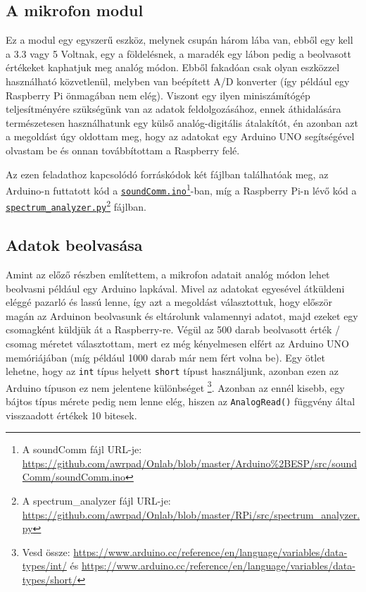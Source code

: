 \documentclass[12pt,a4paper]{article}
\begin{document}
    \subsection{A mikrofon modul}
      Ez a modul egy egyszerű eszköz, melynek csupán három lába van, ebből egy kell a 3.3 vagy 5 Voltnak, egy a földelésnek, a maradék egy lábon pedig a beolvasott értékeket kaphatjuk meg analóg módon. Ebből fakadóan csak olyan eszközzel használható közvetlenül, melyben van beépített A/D konverter (így például egy Raspberry Pi önmagában nem elég). Viszont egy ilyen miniszámítógép teljesítményére szükségünk van az adatok feldolgozásához, ennek áthidalására természetesen használhatunk egy külső analóg-digitális átalakítót, én azonban azt a megoldást úgy oldottam meg, hogy az adatokat egy Arduino UNO segítségével olvastam be és onnan továbbítottam a Raspberry felé.

      Az ezen feladathoz kapcsolódó forráskódok két fájlban találhatóak meg, az Arduino-n futtatott kód a \href{https://github.com/awrpad/Onlab/blob/master/Arduino\%2BESP/src/soundComm/soundComm.ino}{\texttt{soundComm.ino}}\footnote{A soundComm fájl URL-je: \url{https://github.com/awrpad/Onlab/blob/master/Arduino\%2BESP/src/soundComm/soundComm.ino}}-ban, míg a Raspberry Pi-n lévő kód a \href{https://github.com/awrpad/Onlab/blob/master/RPi/src/spectrum\_analyzer.py}{\texttt{spectrum\_analyzer.py}}\footnote{A spectrum\_analyzer fájl URL-je: \url{https://github.com/awrpad/Onlab/blob/master/RPi/src/spectrum\_analyzer.py}} fájlban.

    \subsection{Adatok beolvasása}
      Amint az előző részben említettem, a mikrofon adatait analóg módon lehet beolvasni például egy Arduino lapkával. Mivel az adatokat egyesével átküldeni eléggé pazarló és lassú lenne, így azt a megoldást választottuk, hogy először magán az Arduinon beolvasunk és eltárolunk valamennyi adatot, majd ezeket egy csomagként küldjük át a Raspberry-re. Végül az 500 darab beolvasott érték / csomag méretet választottam, mert ez még kényelmesen elfért az Arduino UNO memóriájában (míg például 1000 darab már nem fért volna be). Egy ötlet lehetne, hogy az \texttt{int} típus helyett \texttt{short} típust használjunk, azonban ezen az Arduino típuson ez nem jelentene különbséget \footnote{Vesd össze: \url{https://www.arduino.cc/reference/en/language/variables/data-types/int/} és \url{https://www.arduino.cc/reference/en/language/variables/data-types/short/}}. Azonban az ennél kisebb, egy bájtos típus mérete pedig nem lenne elég, hiszen az \texttt{AnalogRead()} függvény által visszaadott értékek 10 bitesek.
\end{document}
